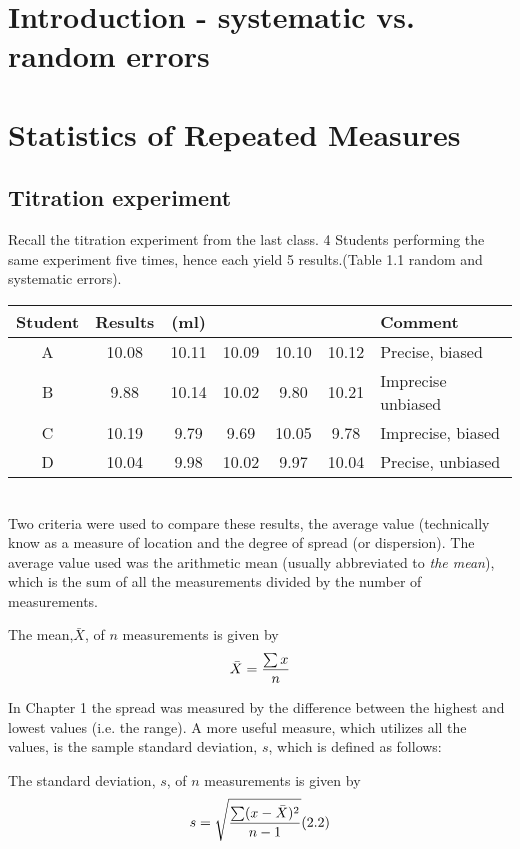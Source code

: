 \section{Introduction - systematic vs. random errors}




\section{Statistics of Repeated Measures}
\subsection{Titration experiment}

Recall the titration experiment from the last class. 4 Students performing the same experiment five times, hence each yield 5 results.(Table 1.1 random and systematic errors).


\begin{tabular}{|c|ccccc|l|}
	\hline
	Student & Results  & (ml) &  &  &  &Comment \\ \hline
	A & 10.08 & 10.11 &10.09 &10.10&10.12 & Precise, biased\\ \hline
	B & 9.88 &10.14& 10.02 &9.80& 10.21& Imprecise unbiased\\ \hline
	C & 10.19 &9.79& 9.69 &10.05& 9.78 & Imprecise, biased\\ \hline
	D & 10.04 &9.98 &10.02 &9.97 &10.04 & Precise, unbiased \\
	\hline
\end{tabular}\\




Two criteria were used to compare these results, the average value (technically know
as a measure of location and the degree of spread (or dispersion). The average value
used was the arithmetic mean (usually abbreviated to \emph{the mean}), which is the sum
of all the measurements divided by the number of measurements.


The mean,$\bar{X}$, of $n$ measurements is given by \[ \bar{X}  = {\sum{x} \over n} \]

In Chapter 1 the spread was measured by the difference between the highest and
lowest values (i.e. the range). A more useful measure, which utilizes all the values, is the sample
standard deviation, $s$, which is defined as follows:

The standard deviation, $s$, of $n$ measurements is given by
\[s=  \sqrt{ {\sum(x-\bar{X})^2 \over n-1} }  (2.2) \]









